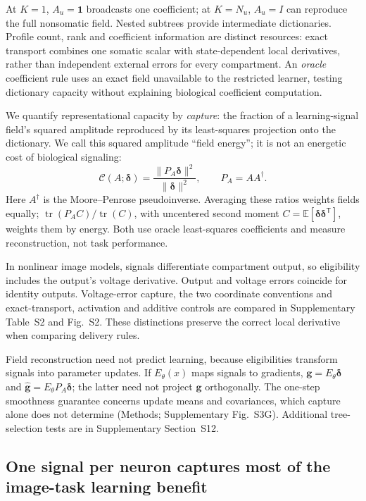 \documentclass[11pt]{article}
\newcommand{\E}{\mathbb{E}}
\DeclareMathOperator{\tr}{tr}
\begin{document}
At \(K=1\), \(A_u=\bm1\) broadcasts one coefficient; at \(K=N_u\), \(A_u=I\) can reproduce the full nonsomatic field. Nested subtrees provide intermediate dictionaries. Profile count, rank and coefficient information are distinct resources: exact transport combines one somatic scalar with state-dependent local derivatives, rather than independent external errors for every compartment. An \emph{oracle} coefficient rule uses an exact field unavailable to the restricted learner, testing dictionary capacity without explaining biological coefficient computation.

We quantify representational capacity by \emph{capture}: the fraction of a learning-signal field's squared amplitude reproduced by its least-squares projection onto the dictionary. We call this squared amplitude ``field energy''; it is not an energetic cost of biological signaling:
\[
\mathcal C(A;\bm\delta)=\frac{\|P_A\bm\delta\|^2}{\|\bm\delta\|^2},\qquad P_A=AA^\dagger.
\]
Here $A^\dagger$ is the Moore--Penrose pseudoinverse. Averaging these ratios weights fields equally; $\tr(P_AC)/\tr(C)$, with uncentered second moment $C=\E[\bm\delta\bm\delta^{\mathsf T}]$, weights them by energy. Both use oracle least-squares coefficients and measure reconstruction, not task performance.

In nonlinear image models, signals differentiate compartment output, so eligibility includes the output's voltage derivative. Output and voltage errors coincide for identity outputs. Voltage-error capture, the two coordinate conventions and exact-transport, activation and additive controls are compared in Supplementary Table~S2 and Fig.~S2. These distinctions preserve the correct local derivative when comparing delivery rules.

Field reconstruction need not predict learning, because eligibilities transform signals into parameter updates. If $E_\theta(x)$ maps signals to gradients, $\bm g=E_\theta\bm\delta$ and $\widehat{\bm g}=E_\theta P_A\bm\delta$; the latter need not project $\bm g$ orthogonally. The one-step smoothness guarantee concerns update means and covariances, which capture alone does not determine (Methods; Supplementary Fig.~S3G). Additional tree-selection tests are in Supplementary Section~S12.

\subsection*{One signal per neuron captures most of the image-task learning benefit}
\end{document}
